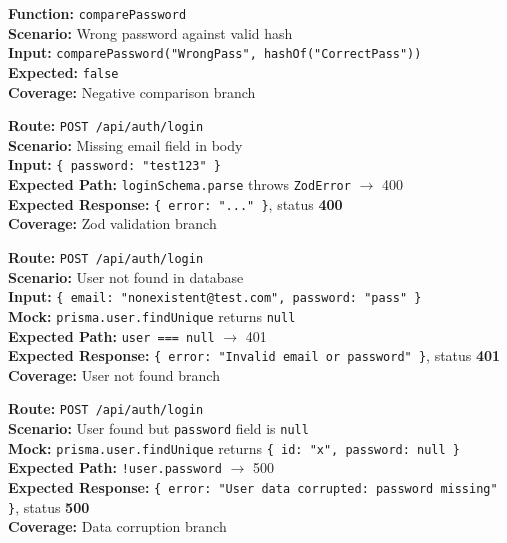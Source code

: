 \documentclass[12pt,a4paper]{report}
\newcommand{\pone}{\textbf{\color{p1red}P1}}
\newcommand{\ptwo}{\textbf{\color{p2orange}P2}}
\begin{document}
\begin{tcolorbox}[testbox, title={AUTH-010 \hfill \pone}]
\textbf{Function:} \texttt{comparePassword} \\
\textbf{Scenario:} Wrong password against valid hash \\
\textbf{Input:} \texttt{comparePassword("WrongPass", hashOf("CorrectPass"))} \\
\textbf{Expected:} \texttt{false} \\
\textbf{Coverage:} Negative comparison branch
\end{tcolorbox}

\begin{tcolorbox}[testbox, title={AUTH-011 \hfill \pone}]
\textbf{Route:} \texttt{POST /api/auth/login} \\
\textbf{Scenario:} Missing email field in body \\
\textbf{Input:} \texttt{\{ password: "test123" \}} \\
\textbf{Expected Path:} \texttt{loginSchema.parse} throws \texttt{ZodError} $\to$ 400 \\
\textbf{Expected Response:} \texttt{\{ error: "..." \}}, status \textbf{400} \\
\textbf{Coverage:} Zod validation branch
\end{tcolorbox}

\begin{tcolorbox}[testbox, title={AUTH-012 \hfill \pone}]
\textbf{Route:} \texttt{POST /api/auth/login} \\
\textbf{Scenario:} User not found in database \\
\textbf{Input:} \texttt{\{ email: "nonexistent@test.com", password: "pass" \}} \\
\textbf{Mock:} \texttt{prisma.user.findUnique} returns \texttt{null} \\
\textbf{Expected Path:} \texttt{user === null} $\to$ 401 \\
\textbf{Expected Response:} \texttt{\{ error: "Invalid email or password" \}}, status \textbf{401} \\
\textbf{Coverage:} User not found branch
\end{tcolorbox}

\begin{tcolorbox}[criticalbox, title={AUTH-013 \hfill \ptwo\ --- Corrupted Data}]
\textbf{Route:} \texttt{POST /api/auth/login} \\
\textbf{Scenario:} User found but \texttt{password} field is \texttt{null} \\
\textbf{Mock:} \texttt{prisma.user.findUnique} returns \texttt{\{ id: "x", password: null \}} \\
\textbf{Expected Path:} \texttt{!user.password} $\to$ 500 \\
\textbf{Expected Response:} \texttt{\{ error: "User data corrupted: password missing" \}}, status \textbf{500} \\
\textbf{Coverage:} Data corruption branch
\end{tcolorbox}
\end{document}
